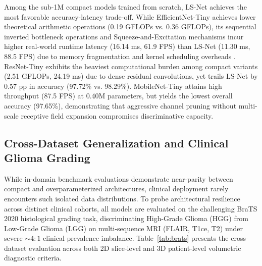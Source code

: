 \documentclass[journal]{IEEEtran}
\begin{document}
Among the sub-1M compact models trained from scratch, LS-Net achieves the most favorable accuracy-latency trade-off. While EfficientNet-Tiny achieves lower theoretical arithmetic operations (0.19 GFLOPs vs. 0.36 GFLOPs), its sequential inverted bottleneck operations and Squeeze-and-Excitation mechanisms incur higher real-world runtime latency (16.14 ms, 61.9 FPS) than LS-Net (11.30 ms, 88.5 FPS) due to memory fragmentation and kernel scheduling overheads \cite{25}. ResNet-Tiny exhibits the heaviest computational burden among compact variants (2.51 GFLOPs, 24.19 ms) due to dense residual convolutions, yet trails LS-Net by 0.57 pp in accuracy (97.72\% vs. 98.29\%). MobileNet-Tiny attains high throughput (87.5 FPS) at 0.40M parameters, but yields the lowest overall accuracy (97.65\%), demonstrating that aggressive channel pruning without multi-scale receptive field expansion compromises discriminative capacity.

\subsection{Cross-Dataset Generalization and Clinical Glioma Grading}

While in-domain benchmark evaluations demonstrate near-parity between compact and overparameterized architectures, clinical deployment rarely encounters such isolated data distributions. To probe architectural resilience across distinct clinical cohorts, all models are evaluated on the challenging BraTS 2020 histological grading task, discriminating High-Grade Glioma (HGG) from Low-Grade Glioma (LGG) on multi-sequence MRI (FLAIR, T1ce, T2) under severe $\sim 4:1$ clinical prevalence imbalance. Table~\ref{tab:brats} presents the cross-dataset evaluation across both 2D slice-level and 3D patient-level volumetric diagnostic criteria.
\end{document}
